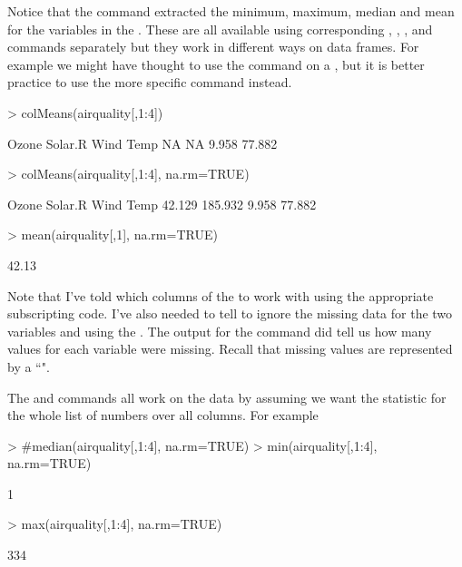 Notice that the  command extracted the minimum, maximum, median and mean for the variables in the . These are all available using corresponding , , , and  commands separately but they work in different ways on data frames. For example we might have thought to use the  command on a , but it is better practice to use the more specific  command instead. 
\begin{Schunk}
\begin{Sinput}
> colMeans(airquality[,1:4]) 
\end{Sinput}
\begin{Soutput}
  Ozone Solar.R    Wind    Temp 
     NA      NA   9.958  77.882 
\end{Soutput}
\begin{Sinput}
> colMeans(airquality[,1:4], na.rm=TRUE) 
\end{Sinput}
\begin{Soutput}
  Ozone Solar.R    Wind    Temp 
 42.129 185.932   9.958  77.882 
\end{Soutput}
\begin{Sinput}
> mean(airquality[,1], na.rm=TRUE) 
\end{Sinput}
\begin{Soutput}
[1] 42.13
\end{Soutput}
\end{Schunk}
Note that I've told \R{} which columns of the   to work with using the appropriate subscripting code. I've also needed to tell \R{} to ignore the missing data for the two variables  and  using the . The output for the  command did tell us how many values for each variable were missing. Recall that missing values are represented by a ``". 
 
The  and  commands all work on the data by assuming we want the statistic for the whole list of numbers over all columns. For example 
\begin{Schunk}
\begin{Sinput}
> #median(airquality[,1:4], na.rm=TRUE) 
> min(airquality[,1:4], na.rm=TRUE) 
\end{Sinput}
\begin{Soutput}
[1] 1
\end{Soutput}
\begin{Sinput}
> max(airquality[,1:4], na.rm=TRUE) 
\end{Sinput}
\begin{Soutput}
[1] 334
\end{Soutput}
\end{Schunk}
 
